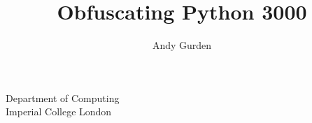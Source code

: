 \usepackage{listings}
\lstset{language=Python, showstringspaces=false}
\usepackage{graphicx}






%
%


{

}


\usepackage[english]{babel}

\usepackage[latin1]{inputenc}

\usepackage{times}
\usepackage[T1]{fontenc}


\title %
{Obfuscating Python 3000}


\author %
{Andy Gurden} %

\institute %
{
  Department of Computing\\
  Imperial College London
}

